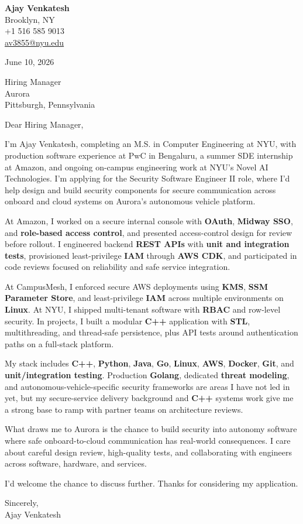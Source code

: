 \documentclass[letterpaper,11pt]{article}
\begin{document}
\begin{flushleft}
\textbf{\large Ajay Venkatesh} \\
Brooklyn, NY \\
+1 516 585 9013 \\
\href{mailto:av3855@nyu.edu}{av3855@nyu.edu}
\end{flushleft}
\vspace{10pt}
June 10, 2026
\vspace{6pt}

Hiring Manager \\
Aurora \\
Pittsburgh, Pennsylvania

\vspace{10pt}

Dear Hiring Manager,

I'm Ajay Venkatesh, completing an M.S. in Computer Engineering at NYU, with production software experience at PwC in Bengaluru, a summer SDE internship at Amazon, and ongoing on-campus engineering work at NYU's Novel AI Technologies. I'm applying for the Security Software Engineer II role, where I'd help design and build security components for secure communication across onboard and cloud systems on Aurora's autonomous vehicle platform.

At Amazon, I worked on a secure internal console with \textbf{OAuth}, \textbf{Midway SSO}, and \textbf{role-based access control}, and presented access-control design for review before rollout. I engineered backend \textbf{REST APIs} with \textbf{unit and integration tests}, provisioned least-privilege \textbf{IAM} through \textbf{AWS CDK}, and participated in code reviews focused on reliability and safe service integration.

At CampusMesh, I enforced secure AWS deployments using \textbf{KMS}, \textbf{SSM Parameter Store}, and least-privilege \textbf{IAM} across multiple environments on \textbf{Linux}. At NYU, I shipped multi-tenant software with \textbf{RBAC} and row-level security. In projects, I built a modular \textbf{C++} application with \textbf{STL}, multithreading, and thread-safe persistence, plus API tests around authentication paths on a full-stack platform.

My stack includes \textbf{C++}, \textbf{Python}, \textbf{Java}, \textbf{Go}, \textbf{Linux}, \textbf{AWS}, \textbf{Docker}, \textbf{Git}, and \textbf{unit/integration testing}. Production \textbf{Golang}, dedicated \textbf{threat modeling}, and autonomous-vehicle-specific security frameworks are areas I have not led in yet, but my secure-service delivery background and \textbf{C++} systems work give me a strong base to ramp with partner teams on architecture reviews.

What draws me to Aurora is the chance to build security into autonomy software where safe onboard-to-cloud communication has real-world consequences. I care about careful design review, high-quality tests, and collaborating with engineers across software, hardware, and services.

I'd welcome the chance to discuss further. Thanks for considering my application.

\vspace{12pt}
Sincerely, \\
Ajay Venkatesh
\end{document}
